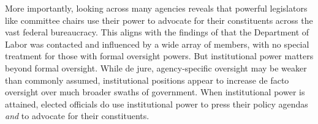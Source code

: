 \documentclass{article}
\begin{document}
More importantly, looking across many agencies reveals that powerful legislators like committee chairs use their power to advocate for their constituents across the vast federal bureaucracy. This aligns with the findings of \citet{RitchieYou2018} that the Department of Labor was contacted and influenced by a wide array of members, with no special treatment for those with formal oversight powers. But institutional power matters beyond formal oversight. While de jure, agency-specific oversight may be weaker than commonly assumed, institutional positions appear to increase de facto oversight over much broader swaths of government. When institutional power is attained, elected officials do use institutional power to press their policy agendas \emph{and} to advocate for their constituents.






\end{document}
